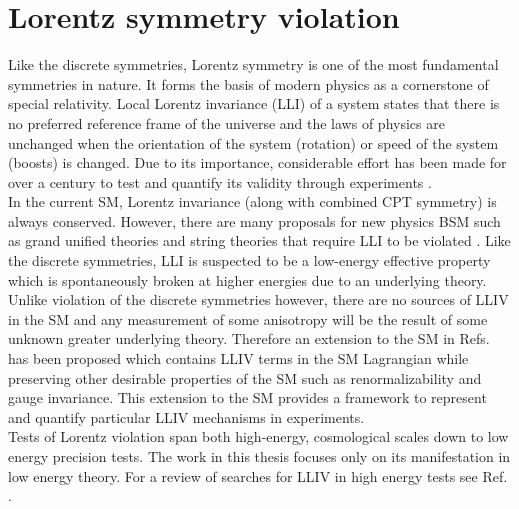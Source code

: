 \documentclass[10pt,a4paper, twoside, openright]{report}
\begin{document}
\section{Lorentz symmetry violation} \label{sec:Lorentz}
Like the discrete symmetries, Lorentz symmetry is one of the most fundamental symmetries in nature. It forms the basis of modern physics as a cornerstone of special relativity. Local Lorentz invariance (LLI) of a system states that there is no preferred reference frame of the universe and the laws of physics are unchanged when the orientation of the system (rotation) or speed of the system (boosts) is changed. Due to its importance, considerable effort has been made for over a century to test and quantify its validity through experiments \cite{Michelson1887, Kennedy1932, Ives1938, Robertson1949, LorentzTestSeries}.  \\
\linebreak
In the current SM, Lorentz invariance (along with combined CPT symmetry) is always conserved. However, there are many proposals for new physics BSM such as grand unified theories and string theories that require LLI to be violated \cite{Kostelecky1989,  Damour, Gambini1999, Pospelov2012, Kostelecky1995, Mavromatos2007, Liberati2013}.  Like the discrete symmetries, LLI is suspected to be a low-energy effective property which is spontaneously broken at higher energies due to an underlying theory. Unlike violation of the discrete symmetries however,  there  are no sources of LLIV in the SM and any measurement of some anisotropy will be the result of some unknown greater underlying theory. Therefore an extension to the SM in Refs. \cite{Colladay1997, Colladay1998, Kostelecky1999, LorentzDataTables2019} has been proposed which contains LLIV terms in the SM Lagrangian while preserving other desirable properties of the SM such as renormalizability and gauge invariance. This extension to the SM provides a framework to represent and quantify particular LLIV mechanisms in experiments. \\
\linebreak
Tests of Lorentz violation span both high-energy, cosmological scales down to low energy precision tests. The work in this thesis focuses only on its manifestation in low energy theory.  For a review of searches for LLIV in high energy tests see Ref. \cite{Coleman1999, Liberati2009, Stecker2012}.   \\
\linebreak
\end{document}
